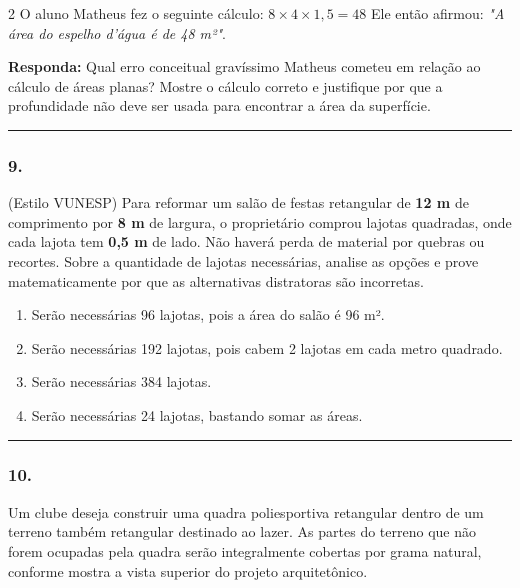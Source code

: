 \documentclass[twoside, 10pt, a4paper]{article}
\newlength{\espacoPreQuestao}\setlength{\espacoPreQuestao}{0.1cm}
\newlength{\espacoQuestao}\setlength{\espacoQuestao}{0.2cm}
\newlength{\espacoAlt}\setlength{\espacoAlt}{0.2cm}
\begin{document}
\begin{multicols*}{2}
O aluno Matheus fez o seguinte cálculo:
$ 8 \times 4 \times 1,5 = 48 $
Ele então afirmou: \textit{"A área do espelho d'água é de 48 m²"}.

\begin{boxresponda}
\textbf{Responda:} Qual erro conceitual gravíssimo Matheus cometeu em relação ao cálculo de áreas planas? Mostre o cálculo correto e justifique por que a profundidade não deve ser usada para encontrar a área da superfície.
\end{boxresponda}
\par\vspace{\espacoQuestao}

\noindent\textcolor{CorLinha}{\rule{\linewidth}{0.5pt}} 
\par\vspace{\espacoPreQuestao}
\subsubsection*{9.} (Estilo VUNESP) Para reformar um salão de festas retangular de \textbf{12 m} de comprimento por \textbf{8 m} de largura, o proprietário comprou lajotas quadradas, onde cada lajota tem \textbf{0,5 m} de lado. Não haverá perda de material por quebras ou recortes. Sobre a quantidade de lajotas necessárias, analise as opções e prove matematicamente por que as alternativas distratoras são incorretas.
\begin{enumerate}[label=\alph*), itemsep=\espacoAlt]
    \item Serão necessárias 96 lajotas, pois a área do salão é 96 m².
    \item Serão necessárias 192 lajotas, pois cabem 2 lajotas em cada metro quadrado.
    \item Serão necessárias 384 lajotas.
    \item Serão necessárias 24 lajotas, bastando somar as áreas.
\end{enumerate}
\par\vspace{\espacoQuestao}

\noindent\textcolor{CorLinha}{\rule{\linewidth}{0.5pt}} 
\par\vspace{\espacoPreQuestao}
\subsubsection*{10.} Um clube deseja construir uma quadra poliesportiva retangular dentro de um terreno também retangular destinado ao lazer. As partes do terreno que não forem ocupadas pela quadra serão integralmente cobertas por grama natural, conforme mostra a vista superior do projeto arquitetônico.


\end{multicols*}
\end{document}
